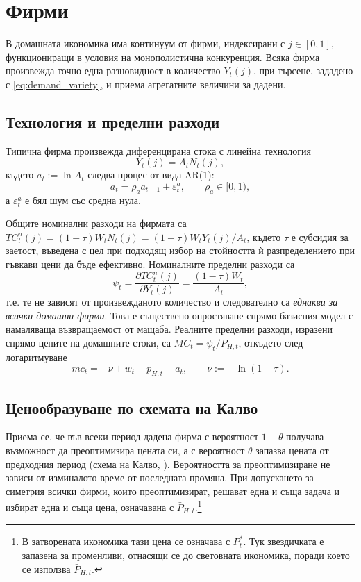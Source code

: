 \section{Фирми}

В домашната икономика има континуум от фирми, индексирани с $j \in [0,1]$, функциониращи в условия на монополистична конкуренция. Всяка фирма произвежда точно една разновидност в количество $Y_t(j)$, при търсене, зададено с \eqref{eq:demand_variety}, и приема агрегатните величини за дадени.

\subsection{Технология и пределни разходи}

Типична фирма произвежда диференцирана стока с линейна технология
\begin{equation}
Y_t(j) = A_t N_t(j),
\label{eq:production}
\end{equation}
където $a_t := \ln A_t$ следва процес от вида AR(1):
\begin{equation}
a_t = \rho_a a_{t-1} + \varepsilon^a_t, \qquad \rho_a \in [0,1),
\label{eq:tech_process}
\end{equation}
а $\varepsilon^a_t$ е бял шум със средна нула.

Общите номинални разходи на фирмата са $TC^n_t(j) = (1-\tau) W_t N_t(j) = (1-\tau) W_t Y_t(j)/A_t$, където $\tau$ е субсидия за заетост, въведена с цел при подходящ избор на стойността ѝ разпределението при гъвкави цени да бъде ефективно. Номиналните пределни разходи са
\[
\psi_t = \frac{\partial TC^n_t(j)}{\partial Y_t(j)} = \frac{(1-\tau) W_t}{A_t},
\]
т.е. те не зависят от произвежданото количество и следователно са \emph{еднакви за всички домашни фирми}. Това е съществено опростяване спрямо базисния модел с намаляваща възвращаемост от мащаба. Реалните пределни разходи, изразени спрямо цените на домашните стоки, са $MC_t = \psi_t / P_{H,t}$, откъдето след логаритмуване
\begin{equation}
mc_t = -\nu + w_t - p_{H,t} - a_t,
\qquad \nu := -\ln(1-\tau).
\label{eq:mc_def}
\end{equation}

\subsection{Ценообразуване по схемата на Калво}

Приема се, че във всеки период дадена фирма с вероятност $1-\theta$ получава възможност да преоптимизира цената си, а с вероятност $\theta$ запазва цената от предходния период (схема на Калво, \cite{Calvo1983}). Вероятността за преоптимизиране не зависи от изминалото време от последната промяна. При допускането за симетрия всички фирми, които преоптимизират, решават една и съща задача и избират една и съща цена, означавана с $\bar{P}_{H,t}$.\footnote{В затворената икономика тази цена се означава с $P^*_t$. Тук звездичката е запазена за променливи, отнасящи се до световната икономика, поради което се използва $\bar{P}_{H,t}$.}

